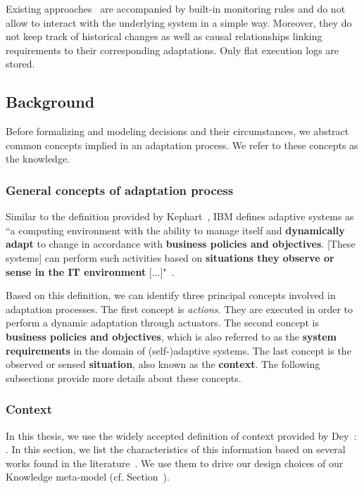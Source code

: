 Existing approaches~\cite{hassel13,heinrich14,ehlers11,DBLP:conf/icse/MendoncaAR14,DBLP:conf/icse/CasanovaGSA14,DBLP:conf/icse/IftikharW14a} are accompanied by built-in monitoring rules and do not allow to interact with the underlying system in a simple way. 
Moreover, they do not keep track of historical changes as well as causal relationships linking requirements to their corresponding adaptations. Only flat execution logs are stored. 

\subsection{Background}
Before formalizing and modeling decisions and their circumstances, we abstract common concepts implied in an adaptation process. We refer to these concepts as the knowledge.

\subsubsection{General concepts of adaptation process}

Similar to the definition provided by Kephart~\cite{DBLP:journals/computer/KephartC03}, IBM  defines adaptive systems as ``a computing environment with the ability to manage itself and \textbf{dynamically adapt} to change in accordance with \textbf{business policies and objectives}. [These systems] can perform such activities based on \textbf{situations they observe or sense in the IT environment} [...]"~\cite{computing2006architectural}.

Based on this definition, we can identify three principal concepts involved in adaptation processes.
The first concept is  \textit{actions}. They are executed in order to perform a dynamic adaptation through actuators.
The second concept is \textbf{business policies and objectives}, which is also referred to as the \textbf{system requirements} in the domain of (self-)adaptive systems.
The last concept is the observed or sensed \textbf{situation}, also known as the \textbf{context}.
The following subsections provide more details about these concepts.

\subsubsection{Context}

In this thesis, we use the widely accepted definition of context provided by Dey~\cite{DBLP:journals/puc/Dey01}: .
In this section, we list the characteristics of this information based on several works found in the literature~\cite{DBLP:conf/pervasive/HenricksenIR02, chong2007context, DBLP:conf/seke/0001FNMKT14, bettini2010survey, DBLP:journals/comsur/PereraZCG14}.
We use them to drive our design choices of our Knowledge meta-model (cf. Section~).

